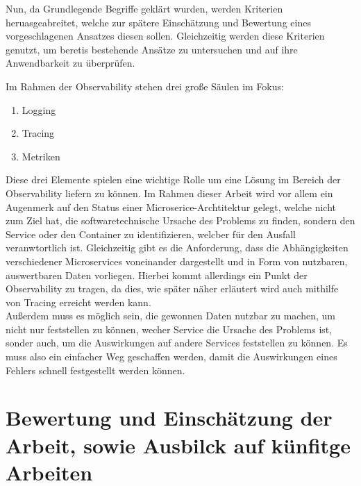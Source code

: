 \documentclass[
	12pt,
	BCOR=5mm,
	DIV=12,
	headinclude=on,
	footinclude=off,
	parskip=half,
	bibliography=totoc,
	listof=entryprefix,
	toc=listof,
	numbers=noenddot,
	plainfootsepline
]{scrreprt}
\begin{document}
Nun, da Grundlegende Begriffe geklärt wurden, werden Kriterien heruasgeabreitet, welche zur spätere Einschätzung und Bewertung eines vorgeschlagenen Ansatzes diesen sollen. Gleichzeitig werden diese Kriterien genutzt, um beretis bestehende Ansätze zu untersuchen und auf ihre Anwendbarkeit zu überprüfen.

Im Rahmen der Observability stehen drei große Säulen im Fokus:
\begin{enumerate}
	\item Logging
	\item Tracing
	\item Metriken
\end{enumerate}

Diese drei Elemente spielen eine wichtige Rolle um eine Lösung im Bereich der Observability liefern zu können. Im Rahmen dieser Arbeit wird vor allem ein Augenmerk auf den Status einer Microserice-Archtitektur gelegt, welche nicht zum Ziel hat, die softwaretechnische Ursache des Problems zu finden, sondern den Service oder den Container zu identifizieren, welcber für den Ausfall veranwtortlich ist. Gleichzeitig gibt es die Anforderung, dass die Abhängigkeiten verschiedener Microservices voneinander dargestellt und in Form von nutzbaren, auswertbaren Daten vorliegen. Hierbei kommt allerdings ein Punkt der Observability zu tragen, da dies, wie später näher erläutert wird auch mithilfe von Tracing erreicht werden kann.\\
Außerdem muss es möglich sein, die gewonnen Daten nutzbar zu machen, um nicht nur feststellen zu können, wecher Service die Ursache des Problems ist, sonder auch, um die Auswirkungen auf andere Services feststellen zu können. Es muss also ein einfacher Weg geschaffen werden, damit die Auswirkungen eines Fehlers schnell festgestellt werden können. 

\chapter{Bewertung und Einschätzung der Arbeit, sowie Ausbilck auf künfitge Arbeiten}
\clearpage
\ihead{}
\printbibliography[title=Literaturverzeichnis]
\cleardoublepage



\end{document}
